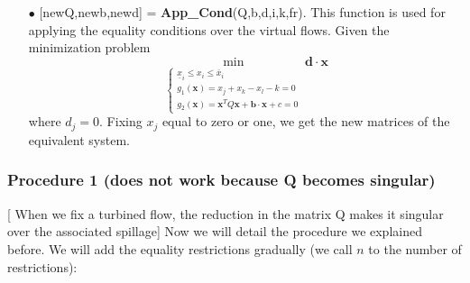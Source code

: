 \documentclass[12pt]{article}
\theoremstyle{definition}
\theoremstyle{remark}
\begin{document}
\begin{enumerate}
\item[$\bullet$] [newQ,newb,newd] = \textbf{App\_Cond}(Q,b,d,i,k,fr). This function is used for applying the equality conditions over the virtual flows. Given the minimization problem
\begin{equation*}
\min_{\begin{cases}
\underline{x}_i\leq x_i\leq\overline{x}_i\\
g_1(\bm{x})=x_j+x_k-x_l-k=0\\
g_2(\bm{x})=\bm{x}^TQ\bm{x}+\bm{b}\cdot\bm{x}+c=0
\end{cases}} \bm{d}\cdot\bm{x}
\end{equation*}
where $d_j=0$. Fixing $x_j$ equal to zero or one, we get the new matrices of the equivalent system.

\end{enumerate}

\subsubsection{Procedure 1 (does not work because Q becomes singular)}

[{\color[rgb]{1,0,0} When we fix a turbined flow, the reduction in the matrix Q makes it singular over the associated spillage}] Now we will detail the procedure we explained before. We will add the equality restrictions gradually (we call $n$ to the number of restrictions):
\end{document}
